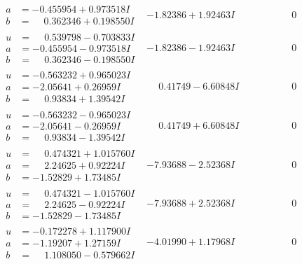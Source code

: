 \documentclass[1p]{elsarticle_modified}
\theoremstyle{definition}
\begin{document}
$$\begin{array}{c|c|c}
\begin{aligned}
a &= -0.455954 + 0.973518 I \\
b &= \phantom{-}0.362346 + 0.198550 I\end{aligned}
 & -1.82386 + 1.92463 I & \phantom{-0.000000 } 0 \\ \hline\begin{aligned}
u &= \phantom{-}0.539798 - 0.703833 I \\
a &= -0.455954 - 0.973518 I \\
b &= \phantom{-}0.362346 - 0.198550 I\end{aligned}
 & -1.82386 - 1.92463 I & \phantom{-0.000000 } 0 \\ \hline\begin{aligned}
u &= -0.563232 + 0.965023 I \\
a &= -2.05641 + 0.26959 I \\
b &= \phantom{-}0.93834 + 1.39542 I\end{aligned}
 & \phantom{-}0.41749 - 6.60848 I & \phantom{-0.000000 } 0 \\ \hline\begin{aligned}
u &= -0.563232 - 0.965023 I \\
a &= -2.05641 - 0.26959 I \\
b &= \phantom{-}0.93834 - 1.39542 I\end{aligned}
 & \phantom{-}0.41749 + 6.60848 I & \phantom{-0.000000 } 0 \\ \hline\begin{aligned}
u &= \phantom{-}0.474321 + 1.015760 I \\
a &= \phantom{-}2.24625 + 0.92224 I \\
b &= -1.52829 + 1.73485 I\end{aligned}
 & -7.93688 - 2.52368 I & \phantom{-0.000000 } 0 \\ \hline\begin{aligned}
u &= \phantom{-}0.474321 - 1.015760 I \\
a &= \phantom{-}2.24625 - 0.92224 I \\
b &= -1.52829 - 1.73485 I\end{aligned}
 & -7.93688 + 2.52368 I & \phantom{-0.000000 } 0 \\ \hline\begin{aligned}
u &= -0.172278 + 1.117900 I \\
a &= -1.19207 + 1.27159 I \\
b &= \phantom{-}1.108050 - 0.579662 I\end{aligned}
 & -4.01990 + 1.17968 I & \phantom{-0.000000 } 0 \\ \hline\begin{aligned}

\end{aligned}
\end{array}$$
\end{document}
